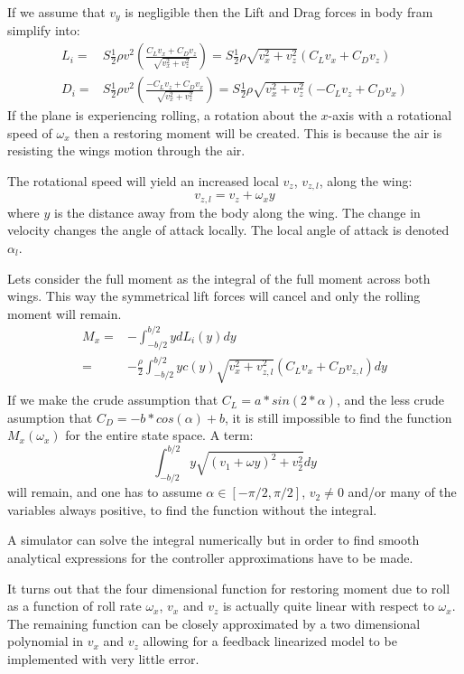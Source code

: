 If we assume that $v_y$ is negligible then the Lift and Drag forces in body fram simplify into:
\begin{equation}\begin{split}
    L_i =& 
     S \frac{1}{2} \rho v^2 \left( \frac{C_L v_x + C_D v_z}{\sqrt{v_x^2 + v_z^2}} \right) = 
      S \frac{1}{2} \rho \sqrt{v_x^2 + v_z^2} \left(C_L v_x + C_D v_z \right)\\
    D_i =& 
     S \frac{1}{2} \rho v^2 \left( \frac{-C_L v_z + C_D v_x}{ \sqrt{v_x^2 + v_z^2}} \right)
     = S \frac{1}{2} \rho \sqrt{v_x^2 + v_z^2} \left(-C_L v_z + C_D v_x\right)
     \label{liftdragbody}
\end{split}\end{equation}
If the plane is experiencing rolling, a rotation about the $x$-axis with a rotational speed of $\omega_x$ then a restoring moment will be created.
This is because the air is resisting the wings motion through the air.

The rotational speed will yield an increased local $v_z$, $v_{z,l}$, along the wing:
\begin{equation}
    v_{z, l} = v_z + \omega_x y
\end{equation}
where $y$ is the distance away from the body along the wing.
The change in velocity changes the angle of attack locally.
The local angle of attack is denoted $\alpha_l$.

Lets consider the full moment as the integral of the full moment across both wings.
This way the symmetrical lift forces will cancel and only the rolling moment will remain.
\begin{equation}\begin{split}
    M_x =& -\int_{-b/2}^{b/2} y dL_i(y) dy \\
    =& -\frac{\rho}{2}\int_{-b/2}^{b/2} y c(y) \sqrt{v_x^2 + v_{z,l}^2} \left(C_L v_x + C_D v_{z,l} \right) dy \\
\end{split}\end{equation}
If we make the crude assumption that $C_L = a * sin(2*\alpha)$, and the less crude asumption that $C_D = -b * cos(\alpha) + b$, it is still impossible to find the function $M_x(\omega_x)$ for the entire state space.
A term:
\begin{equation}
    \int_{-b/2}^{b/2} y \sqrt{(v_1 + \omega y)^2 + v_2^2} dy
\end{equation}
will remain, and one has to assume $\alpha \in [-\pi/2, \pi/2]$, $v_2 \neq 0$ and/or many of the variables always positive, to find the function without the integral.

A simulator can solve the integral numerically but in order to find smooth analytical expressions for the controller approximations have to be made.

It turns out that the four dimensional function for restoring moment due to roll as a function of roll rate $\omega_x$, $v_x$ and $v_z$ is actually quite linear with respect to $\omega_x$.
The remaining function can be closely approximated by a two dimensional polynomial in $v_x$ and $v_z$ allowing for a feedback linearized model to be implemented with very little error.